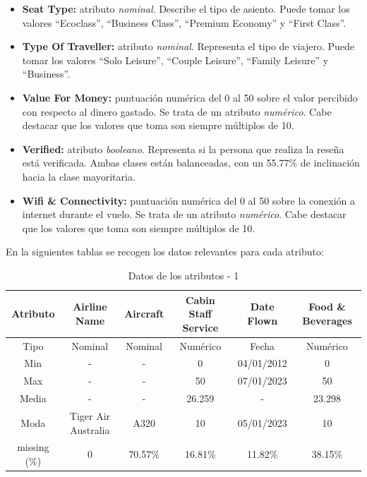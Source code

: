 \documentclass[12pt]{report} %
\begin{document}
\begin{itemize}
    \item \textbf{Seat Type:} atributo \textit{nominal}. Describe el tipo de asiento. Puede tomar los valores ``Ecoclass'',  ``Business Class'', ``Premium Economy'' y ``First Class''.  
    \item \textbf{Type Of Traveller:} atributo \textit{nominal}. Representa el tipo de viajero. Puede tomar los valores ``Solo Leisure'', ``Couple Leisure'', ``Family Leisure'' y ``Business''.
    \item \textbf{Value For Money:} puntuación numérica del 0 al 50 sobre el valor percibido con respecto al dinero gastado. Se trata de un atributo \textit{numérico}. Cabe destacar que los valores que toma son siempre múltiplos de 10.
    \item \textbf{Verified:} atributo \textit{booleano}. Representa si la persona que realiza la reseña está verificada. Ambas clases están balanceadas, con un 55.77\% de inclinación hacia la clase mayoritaria.
    \item \textbf{Wifi \& Connectivity:} puntuación numérica del 0 al 50 sobre la conexión a internet durante el vuelo. Se trata de un atributo \textit{numérico}. Cabe destacar que los valores que toma son siempre múltiplos de 10.
\end{itemize}
En la siguientes tablas se recogen los datos relevantes para cada atributo: 
\begin{table}[H]
    \begin{center}
        \begin{tabular}{@{}cccccc@{}}
            \toprule
            Atributo & Airline Name       & Aircraft & Cabin Staff Service & Date Flown & Food \& Beverages \\ 
            \midrule
            Tipo     & Nominal            & Nominal  & Numérico            & Fecha      & Numérico          \\ 
            Min      & -                  & -        & 0                   & 04/01/2012 & 0                 \\ 
            Max      & -                  & -        & 50                  & 07/01/2023 & 50                \\ 
            Media    & -                  & -        & 26.259              & -          & 23.298            \\ 
            Moda     & Tiger Air Australia& A320     & 10                  & 05/01/2023 & 10                \\ 
            missing (\%) & 0              & 70.57\%  & 16.81\%             & 11.82\%    & 38.15\%           \\ 
            \bottomrule
        \end{tabular} 
        \caption{Datos de los atributos - 1}
    \end{center}
\end{table}
\end{document}
